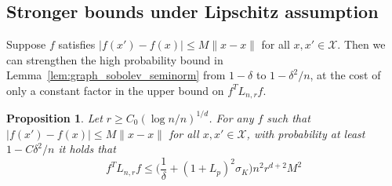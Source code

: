 \documentclass[twoside]{article}
\newcommand{\1}{\mathbf{1}}
\newcommand{\Lap}{L}
\newcommand{\mc}[1]{\mathcal{#1}}
\newtheorem{proposition}{Proposition}
\theoremstyle{definition}
\theoremstyle{remark}
\begin{document}
\subsection{Stronger bounds under Lipschitz assumption}
Suppose $f$ satisfies $|f(x') - f(x)| \leq M \|x - x\|$ for all $x,x' \in \mc{X}$. Then we can strengthen the high probability bound in Lemma~\ref{lem:graph_sobolev_seminorm} from $1 - \delta$ to $1 - \delta^2/n$, at the cost of only a constant factor in the upper bound on $f^T \Lap_{n,r} f$.
\begin{proposition}
	\label{prop:graph_sobolev_seminorm_lipschitz}
	Let $r \geq C_0(\log n/n)^{1/d}$. For any $f$ such that $|f(x') - f(x)| \leq M \|x - x\|$ for all $x,x' \in \mc{X}$, with probability at least $1 - C\delta^2/n$ it holds that
	\begin{equation*}
	f^T \Lap_{n,r} f \leq \biggl(\frac{1}{\delta} + (1 + L_p)^2 \sigma_K\biggr) n^2 r^{d + 2} M^2
	\end{equation*}
\end{proposition}
\end{document}
